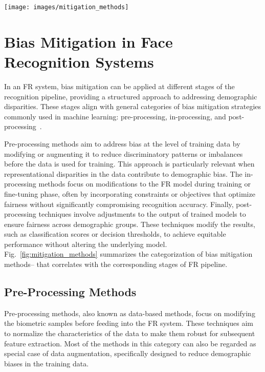 
\begin{figure*}[!t]
\centering
\texttt{[image: images/mitigation\_methods]}
\caption{Illustration of categories of methods of bias mitigation in FR.}
\label{fig:mitigation_methods}
\end{figure*}
    
\section{Bias Mitigation in Face Recognition Systems}
\label{sec:mitigation}

In an FR system, bias mitigation can be applied at different stages of the
recognition pipeline, providing a structured approach to addressing demographic
disparities. These stages align with general categories of bias mitigation
strategies commonly used in machine learning: pre-processing, in-processing,
and post-processing~\cite{pessach2022review, mehrabi2021survey,
singh2022anatomizing, hort2024bias}.

Pre-processing methods aim to address bias at the level of training data by
modifying or augmenting it to reduce discriminatory patterns or imbalances
before the data is used for training. This approach is particularly relevant
when representational disparities in the data contribute to demographic bias.
The in-processing methods focus on modifications to the FR model during training
or fine-tuning phase, often by incorporating constraints or objectives that
optimize fairness without significantly compromising recognition accuracy.
Finally, post-processing techniques involve adjustments to the output of trained
models to ensure fairness across demographic groups. These techniques modify the
results, such as classification scores or decision thresholds, to achieve
equitable performance without altering the underlying model.
Fig.~\ref{fig:mitigation_methods} summarizes the categorization of bias
mitigation methods-- that correlates with the corresponding stages of FR
pipeline. 

\subsection{Pre-Processing Methods}

Pre-processing methods, also known as data-based methods, focus on modifying
the biometric samples before feeding into the FR system. These techniques aim
to normalize the characteristics of the data to make them robust for
subsequent feature extraction. Most of the methods in this category can also be
regarded as special case of data augmentation, specifically designed to reduce
demographic biases in the training data.

